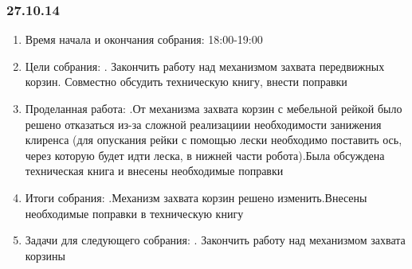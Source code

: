 \documentclass[11pt]{article}
\begin{document}
            \subsubsection{27.10.14}
            \begin{enumerate}
               \item Время начала и окончания собрания:
               18:00-19:00
               \newline
               \item Цели собрания:
               . Закончить работу над механизмом захвата передвижных корзин. Совместно обсудить техническую книгу, внести поправки
               \item Проделанная работа:
               .От механизма захвата корзин с мебельной рейкой было решено отказаться из-за сложной реализациии необходимости занижения клиренса (для опускания рейки с помощью лески необходимо поставить ось, через которую будет идти леска, в нижней части робота).Была обсуждена техническая книга и внесены необходимые поправки 
               \item Итоги собрания:
               .Механизм захвата корзин решено изменить.Внесены необходимые поправки в техническую книгу
               \item Задачи для следующего собрания:
               . Закончить работу над механизмом захвата корзины
            \end{enumerate}
            \newpage
\end{document}
